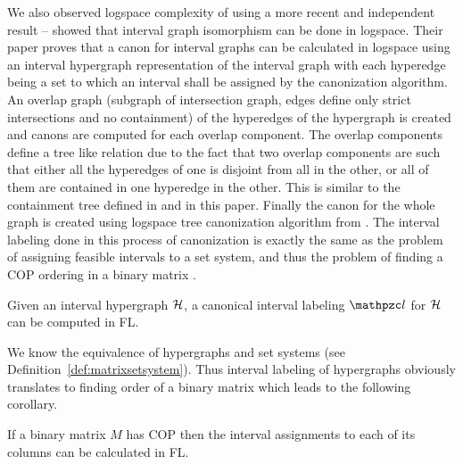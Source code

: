 We also observed logspace complexity of \COP using a more recent and
independent result -- \cite{kklv10} showed that interval graph
isomorphism can be done in logspace. Their paper proves that a canon
for interval graphs can be calculated in logspace using an interval
hypergraph representation of the interval graph with each hyperedge
being a set to which an interval shall be assigned by the canonization
algorithm. An overlap graph (subgraph of intersection graph, edges
define only strict intersections and no containment) of the hyperedges
of the hypergraph is created and canons are computed for each overlap
component. The overlap components define a tree like relation due to
the fact that two overlap components are such that either all the
hyperedges of one is disjoint from all in the other, or all of them
are contained in one hyperedge in the other. This is similar to the
containment tree defined in \cite{nsnrs09} and in this paper. Finally
the canon for the whole graph is created using logspace tree
canonization algorithm from \cite{sl92}. The interval labeling done in
this process of canonization is exactly the same as the problem of
assigning feasible intervals to a set system, and thus the problem of
finding a COP ordering in a binary matrix \cite{nsnrs09}.

\begin{theorem}
  \label{th:canonlabel}
  Given an interval hypergraph ${\cal H}$, a canonical interval labeling
  $\cl$ for ${\cal H}$ can be computed in {\sc FL}.
\end{theorem}

We know the equivalence of hypergraphs and set systems (see
Definition~\ref{def:matrixsetsystem}). Thus interval labeling of
hypergraphs obviously translates to finding \COP order of a binary
matrix which leads to the following corollary.

\begin{corollary}
  \label{cor:coplog}
  If a binary matrix $M$ has COP then the interval assignments to each
  of its columns can be calculated in {\sc FL}.
\end{corollary}

